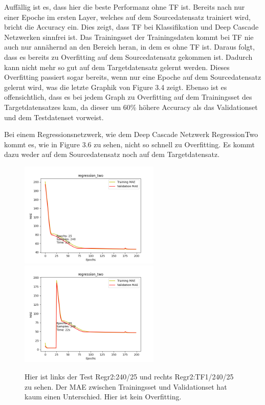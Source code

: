 Auffällig ist es, dass hier die beste Performanz ohne TF ist. Bereits nach nur einer Epoche im ersten Layer, welches auf dem Sourcedatensatz 
trainiert wird, bricht die Accuracy ein. Dies zeigt, dass TF bei Klassifikation und Deep Cascade Netzwerken sinnfrei ist. Das 
Trainingsset der Trainingsdaten kommt bei TF nie auch nur annähernd an den Bereich heran, in dem es ohne TF ist. Daraus folgt, dass es 
bereits zu Overfitting auf dem Sourcedatensatz gekommen ist. Dadurch kann nicht mehr so gut auf dem Targetdatensatz gelernt werden. Dieses 
Overfitting passiert sogar bereits, wenn nur eine Epoche auf dem Sourcedatensatz gelernt wird, was die letzte Graphik von Figure 3.4 zeigt. 
Ebenso ist es offensichtlich, dass es bei jedem Graph zu Overfitting auf dem Trainingsset des Targetdatensatzes kam, da dieser um 60\% höhere 
Accuracy als das Validationset und dem Testdatenset vorweist. 

Bei einem Regressionsnetzwerk, wie dem Deep Cascade Netzwerk RegressionTwo kommt es, wie in Figure 3.6 zu sehen, nicht so schnell zu Overfitting. 
Es kommt dazu weder auf dem Sourcedatensatz noch auf dem Targetdatensatz. 

\begin{figure}[htpb]
    \includegraphics[height=5cm]{../../Plots/ba_plots/regr2/woregr2tr.png}
    \includegraphics[height=5cm]{../../Plots/ba_plots/regr2/1TFtr.png}
    \caption{\label{fig:regr2tf} 
    \small{Hier ist links der Test Regr2:240/25 und rechts Regr2:TF1/240/25 zu sehen. Der MAE zwischen Trainingsset und Validationset hat kaum 
    einen Unterschied. Hier ist kein Overfitting.}}
\end{figure}

